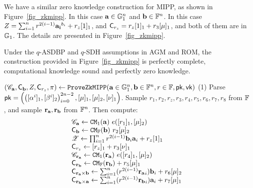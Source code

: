 We have a similar zero knowledge construction for 
MIPP, as shown in Figure\ \ref{fig_zkmipp}.
In this case ${{\mathbf {a}}} \in {\mathbb{G}}_1^n$
and ${{\mathbf {b}}} \in \mathbb{F}^n$.
In this case $Z = \sum_{i=1}^n r^{2(i-1)} {{\mathbf {a_i}}}^{b_i} + r_z [1]_1$,
and ${\mathsf{C}}_{r_z} = r_z[1]_1 + r_3[\mu]_1$, and both of them
are in ${\mathbb{G}}_1$. The details are presented in Figure\ \ref{fig_zkmipp}.


\begin{lemma}\label{lemma_zkmipp} Under the $q$-ASDBP and $q$-SDH assumptions
\cite{Bunz21} in AGM and ROM, the construction provided in 
Figure\ \ref{fig_zkmipp} is perfectly complete, computational knowledge
sound and perfectly zero knowledge.
\end{lemma}

\def\hp{\hspace*{0.1in}}
\begin{small}
\begin{algorithm}[bt]
$ (\GCommit_\myvec{a}, \Commit_\myvec{b}, Z, \Commit_{r_z}, \prf) 
	\leftarrow \newline
	\zkmippprove(\myvec{a} \in \G_1^n, \myvec{b} \in \F^n, r \in \F, \pk, \vk)$
\newline
(1) Parse $\mathsf{pk} = \left(\left([\alpha^i]_1, [\beta^i]_2\right)_{i=0}^{2n-2},
	[\mu]_1, [\mu]_2, [\nu]_1\right)$. 
Sample $r_1, r_2, r_z, r_3, r_4, r_5, r_6, r_7, r_8$ from $\mathbb{F}$, 
and sample ${{\mathbf {r_a}}}, {{\mathbf {r_b}}}$ from $\mathbb{F}^n$. Then compute:
\[
\begin{array} {l}
\GCommit_\myvec{a} \leftarrow \gcm_1(\myvec{a})~ e([r_1]_1, [\mu]_2) \\
\Commit_\myvec{b} \leftarrow \gcm_\F(\myvec{b})~ r_2 [\mu]_2 \\
\Z \leftarrow \prod_{i=1}^n r^{2(i-1)} \myvec{b}_i \myvec{a}_i
+ r_z [1]_1 \\
\Commit_{r_z} \leftarrow [r_z]_1 + r_3[\nu]_1 \\
\GCommit_\myvec{r_a} \leftarrow \gcm_1(\myvec{r_a})~ e([r_4]_1, [\mu]_2) \\
\Commit_\myvec{r_b} \leftarrow \gcm_\F(\myvec{r_b}) + r_5 [\mu]_1\\
\newline
\Commit_\myvec{r_a\times b} \leftarrow 
\sum_{i=1}^n (r^{2(i-1)} \myvec{r_a}_i) \myvec{b}_i + 
  r_6[\mu]_2 \\
\Commit_\myvec{r_b\times a} \leftarrow 
\sum_{i=1}^n (r^{2(i-1)} \myvec{r_b}_i) \myvec{a}_i + 
  r_7 [\mu]_1 \\

\end{array}\]
\end{algorithm}
\end{small}
